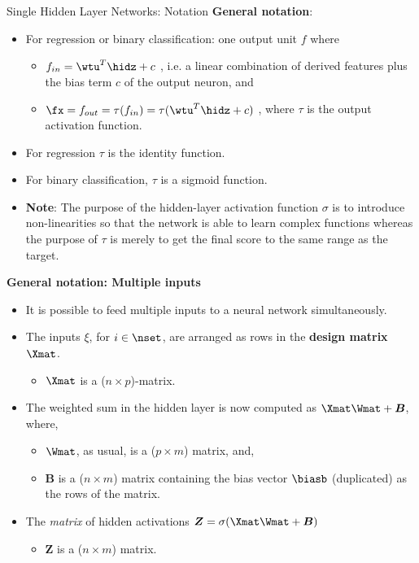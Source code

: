 \begin{vbframe}{Single Hidden Layer Networks: Notation}
  \textbf{General notation}:
  \begin{itemize}
    \vspace{4mm}
    \item For regression or binary classification: one output unit $f$ where
      \begin{itemize}
        \item $f_{in} = \wtu^T \hidz + c$ , i.e. a linear combination of derived features plus the bias term $c$ of the output neuron, and
        \vspace{2mm}
        \item $\fx= f_{out} = \tau(f_{in}) = \tau(\wtu^T \hidz + c)$ , where $\tau$ is the output activation function.
      \end{itemize}
    \item For regression $\tau$ is the identity function.
    \item For binary classification, $\tau$ is a sigmoid function.
    \item \textbf{Note}: The purpose of the hidden-layer activation function $\sigma$ is to introduce non-linearities so that the network is able to learn complex functions whereas the purpose of $\tau$ is merely to get the final score to the same range as the target.
  \end{itemize}

\framebreak 

  \textbf{General notation: Multiple inputs}
  \begin{itemize}
    \item It is possible to feed multiple inputs to a neural network simultaneously.
    \vspace{2mm}
    \item The inputs $\xi$, for $i \in \nset$, are arranged as rows in the \textbf{design matrix} $\Xmat$.
    \begin{itemize}
      \item $\Xmat$ is a ($n \times p$)-matrix.
    \end{itemize}
    \vspace{2mm}
    \item The weighted sum in the hidden layer is now computed as $\Xmat\Wmat + \bm{B}$, where,
      \begin{itemize}
        \item $\Wmat$, as usual, is a ($p \times m$) matrix, and,
        \vspace{2mm}
        \item $\bm{B}$ is a ($n \times m$) matrix containing the bias vector $\biasb$ (duplicated) as the rows of the matrix.
      \end{itemize}
    \vspace{2mm}
    \item The \textit{matrix} of hidden activations $\bm{Z} = \sigma(\Xmat\Wmat + \bm{B})$
    \begin{itemize}
      \item $\bm{Z}$ is a ($n \times m$) matrix.
    \end{itemize}
  \end{itemize}


\end{vbframe}
